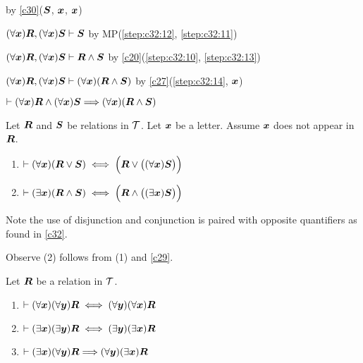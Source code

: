 \begin{pf}
by \ref{c30}($\boldsymbol{S}$, $\boldsymbol{x}$, $\boldsymbol{x}$)
\item\label{step:c32:13} $(\forall\boldsymbol{x})\boldsymbol{R},(\forall\boldsymbol{x})\boldsymbol{S}\vdash\boldsymbol{S}$
by MP(\ref{step:c32:12}, \ref{step:c32:11})
\item\label{step:c32:14} $(\forall\boldsymbol{x})\boldsymbol{R},(\forall\boldsymbol{x})\boldsymbol{S}\vdash\boldsymbol{R}\land\boldsymbol{S}$
by \ref{c20}(\ref{step:c32:10}, \ref{step:c32:13})
\item\label{step:c32:15} $(\forall\boldsymbol{x})\boldsymbol{R},(\forall\boldsymbol{x})\boldsymbol{S}\vdash(\forall\boldsymbol{x})(\boldsymbol{R}\land\boldsymbol{S})$
by \ref{c27}(\ref{step:c32:14}, $\boldsymbol{x}$)
\item\label{step:c32:16} $\vdash(\forall\boldsymbol{x})\boldsymbol{R}\land(\forall\boldsymbol{x})\boldsymbol{S}\Longrightarrow(\forall\boldsymbol{x})(\boldsymbol{R}\land\boldsymbol{S})$
\end{pf}

\begin{dc}\label{c33}%
Let $\boldsymbol{R}$ and $\boldsymbol{S}$ be relations in $\mathcal{T}$.
Let $\boldsymbol{x}$ be a letter. Assume $\boldsymbol{x}$ does not
appear in $\boldsymbol{R}$.
\begin{enumerate}
\item $\vdash(\forall\boldsymbol{x})(\boldsymbol{R}\lor\boldsymbol{S})\iff\Bigl(\boldsymbol{R}\lor\bigl((\forall\boldsymbol{x})\boldsymbol{S}\bigr)\Bigr)$
\item $\vdash(\exists\boldsymbol{x})(\boldsymbol{R}\land\boldsymbol{S})\iff\Bigl(\boldsymbol{R}\land\bigl((\exists\boldsymbol{x})\boldsymbol{S}\bigr)\Bigr)$
\end{enumerate}
Note the use of disjunction and conjunction is paired with opposite
quantifiers as found in \ref{c32}.
\end{dc}
Observe (2) follows from (1) and \ref{c29}.

\begin{dc}\label{c34}%
Let $\boldsymbol{R}$ be a relation in $\mathcal{T}$.
\begin{enumerate}
\item $\vdash(\forall\boldsymbol{x})(\forall\boldsymbol{y})\boldsymbol{R}\iff(\forall\boldsymbol{y})(\forall\boldsymbol{x})\boldsymbol{R}$
\item $\vdash(\exists\boldsymbol{x})(\exists\boldsymbol{y})\boldsymbol{R}\iff(\exists\boldsymbol{y})(\exists\boldsymbol{x})\boldsymbol{R}$
\item $\vdash(\exists\boldsymbol{x})(\forall\boldsymbol{y})\boldsymbol{R}\Longrightarrow(\forall\boldsymbol{y})(\exists\boldsymbol{x})\boldsymbol{R}$
\end{enumerate}
\end{dc}
